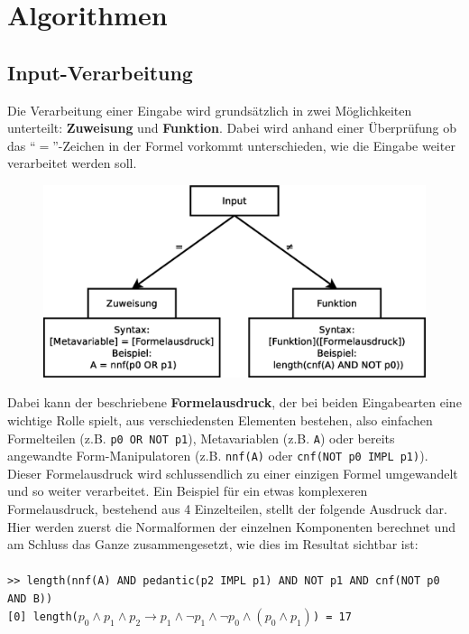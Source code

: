 \documentclass[11pt,a4paper,ngerman]{scrreprt}
\begin{document}
\section{Algorithmen}
\subsection{Input-Verarbeitung}
\label{section:inputverarbeitung}
Die Verarbeitung einer Eingabe wird grundsätzlich in zwei Möglichkeiten unterteilt: \textbf{Zuweisung} und \textbf{Funktion}. Dabei wird anhand einer Überprüfung ob das ``$=$''-Zeichen in der Formel vorkommt unterschieden, wie die Eingabe weiter verarbeitet werden soll.
\begin{figure}[ht]
\centering
\includegraphics[width=.9\linewidth]{pics/input.eps}
\end{figure}
Dabei kann der beschriebene \textbf{Formelausdruck}, der bei beiden Eingabearten eine wichtige Rolle spielt, aus verschiedensten Elementen bestehen, also einfachen Formelteilen (z.B. \texttt{p0 OR NOT p1}), Metavariablen (z.B. \texttt{A}) oder bereits angewandte Form-Manipulatoren (z.B. \texttt{nnf(A)} oder \texttt{cnf(NOT p0 IMPL p1)}). Dieser Formelausdruck wird schlussendlich zu einer einzigen Formel umgewandelt und so weiter verarbeitet. Ein Beispiel für ein etwas komplexeren Formelausdruck, bestehend aus 4 Einzelteilen, stellt der folgende Ausdruck dar. Hier werden zuerst die Normalformen der einzelnen Komponenten berechnet und am Schluss das Ganze zusammengesetzt, wie dies im Resultat sichtbar ist: \\\\
\texttt{>> length(nnf(A) AND pedantic(p2 IMPL p1) AND NOT p1 AND cnf(NOT p0 AND B))}\\
\texttt{[0] length($p_0 \wedge p_1 \wedge p_2 \rightarrow p_1 \wedge \neg p_1 \wedge \neg p_0 \wedge ( p_0 \wedge p_1 )$) = 17}
\end{document}
